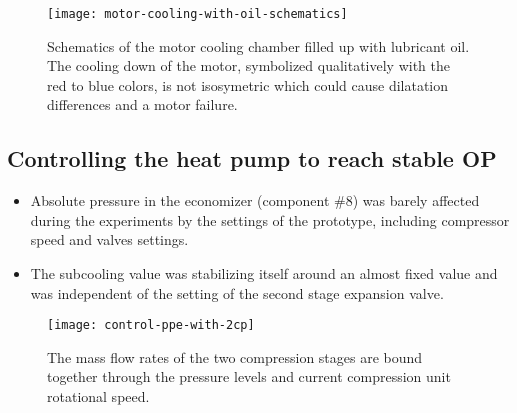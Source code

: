 \begin{figure}[htbp]
  \centering
  \texttt{[image: motor-cooling-with-oil-schematics]}
  \caption[Schematic of the motor cooling chamber filled up with
  lubricant oil]{Schematics of the motor cooling chamber filled up
    with lubricant oil. The cooling down of the motor, symbolized
    qualitatively with the red to blue colors, is not isosymetric
    which could cause dilatation differences and a motor failure.}
  \label{fig:awp-motor-with-oil}
\end{figure}

\subsection{Controlling the heat pump to reach stable OP}
\label{sec:awp-issue-control}

\begin{itemize}
\item Absolute pressure in the economizer (component
  \#8) was barely affected during the experiments by
  the settings of the prototype, including compressor speed and valves
  settings.
  \item The subcooling value was stabilizing itself around an almost
  fixed value and was independent of the setting of the second stage
  expansion valve.
\end{itemize}

\begin{figure}[htbp]
  \centering
  \texttt{[image: control-ppe-with-2cp]}
  \caption[The flow rates of the compression stages are bound
  together]{The mass flow rates of the two compression stages are
    bound together through the pressure levels and current
    compression unit rotational speed. }
  \label{fig:awp-control-ppe-2cp}
\end{figure}

